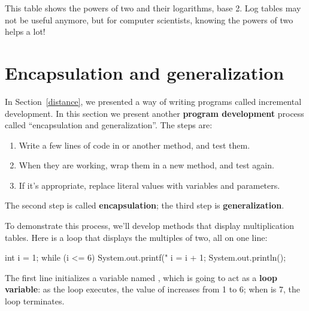 This table shows the powers of two and their logarithms, base 2.
Log tables may not be useful anymore, but for computer scientists, knowing the powers of two helps a lot!


\section{Encapsulation and generalization}
\label{encapsulation}


In Section~\ref{distance}, we presented a way of writing programs called incremental development.
In this section we present another {\bf program development} process called ``encapsulation and generalization''.
The steps are:

\begin{enumerate}

\item Write a few lines of code in  or another method, and test them.

\item When they are working, wrap them in a new method, and test again.

\item If it's appropriate, replace literal values with variables and parameters.

\end{enumerate}


The second step is called {\bf encapsulation}; the third step is {\bf generalization}.

To demonstrate this process, we'll develop methods that display multiplication tables.
Here is a loop that displays the multiples of two, all on one line:

\begin{code}
int i = 1;
while (i <= 6) {
    System.out.printf("%
    i = i + 1;
}
System.out.println();
\end{code}


The first line initializes a variable named , which is going to act as a {\bf loop variable}: as the loop executes, the value of  increases from 1 to 6; when  is 7, the loop terminates.

